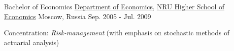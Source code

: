 \begin{cventries}
\cventry
    {Bachelor of Economics} %
    {\href{http://economics.hse.ru/en/}{Department of Economics}, \href{http://www.hse.ru/en/}{NRU Higher School of Economics}} %
    {Moscow, Russia} %
    {Sep. 2005 - Jul. 2009} %
    {
      \begin{cvitems} %
        \item {Concentration: \emph{Risk-management} (with emphasis on stochastic methods of actuarial analysis)}
      \end{cvitems}
    }
\end{cventries}
